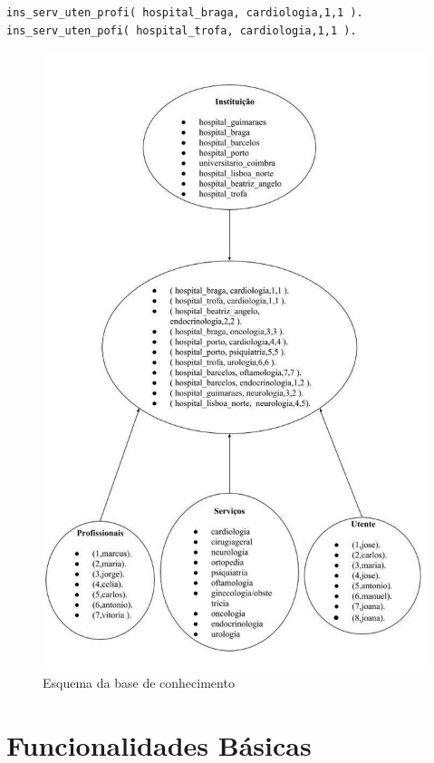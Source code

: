 \begin{verbatim}
ins_serv_uten_profi( hospital_braga, cardiologia,1,1 ).
ins_serv_uten_pofi( hospital_trofa, cardiologia,1,1 ).
\end{verbatim}

\begin{figure}[<+htpb+>]
	\centering
	\includegraphics[scale=0.18]{esquema.jpg}
	\caption{Esquema da base de conhecimento }
	\label{p3:fig:esquema1}
\end{figure}
\newpage


\section{Funcionalidades Básicas}
\label{p3:funcbasic}

